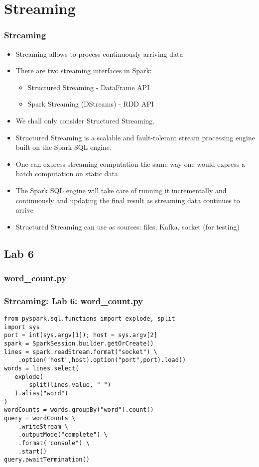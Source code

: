 \section{Streaming}
\begin{frame}[fragile]
\frametitle{Streaming}
\begin{itemize}
\item Streaming allows to process continuously arriving data
\item There are two streaming interfaces in Spark:
  \begin{itemize}
  \item {\color{mycolordef}Structured Streaming} - DataFrame API
  \item {\color{mycolordef}Spark Streaming (DStreams)} - RDD API
  \end{itemize}
\item We shall only consider Structured Streaming.
\item Structured Streaming is a scalable and fault-tolerant stream processing engine built on the Spark SQL engine. 
\item One can express streaming computation the same way one would express a batch computation on static data. 
\item The Spark SQL engine will take care of running it incrementally and continuously and updating the final result as streaming data continues to arrive
\item Structured Streaming can use as sources: files, Kafka, socket (for testing)
\end{itemize}
\end{frame}

\subsection{Lab 6}
\subsubsection{word\_count.py}
\begin{frame}[fragile]
\frametitle{Streaming: Lab 6: word\_count.py}
{\small
{\color{mycolorcode}
\begin{verbatim}
from pyspark.sql.functions import explode, split
import sys
port = int(sys.argv[1]); host = sys.argv[2]
spark = SparkSession.builder.getOrCreate()
lines = spark.readStream.format("socket") \
    .option("host",host).option("port",port).load()
words = lines.select(
   explode(
       split(lines.value, " ")
   ).alias("word")
)
wordCounts = words.groupBy("word").count()
query = wordCounts \
    .writeStream \
    .outputMode("complete") \
    .format("console") \
    .start()
query.awaitTermination()
\end{verbatim}
}}
\end{frame}

